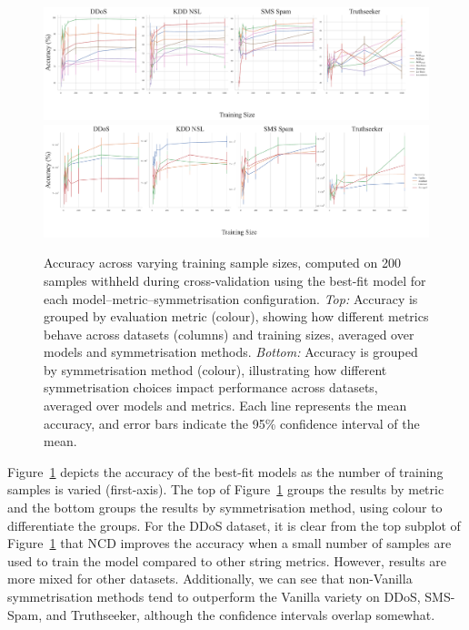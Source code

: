 \documentclass[preprint,12pt]{article}
\begin{document}
\begin{figure}[!bht]
    \centering
    \includegraphics[width=\textwidth]{images/accuracy_vs_sample_size_vs_metric.pdf}
    \hfill
    \includegraphics[width=\textwidth]{images/accuracy_vs_sample_size_vs_symmetric.pdf}
    \caption{
        Accuracy across varying training sample sizes, computed on 200 samples withheld during cross-validation using the best-fit model for each model–metric–symmetrisation configuration. \textit{Top:} Accuracy is grouped by evaluation metric (colour), showing how different metrics behave across datasets (columns) and training sizes, averaged over models and symmetrisation methods. \textit{Bottom:} Accuracy is grouped by symmetrisation method (colour), illustrating how different symmetrisation choices impact performance across datasets, averaged over models and metrics. Each line represents the mean accuracy, and error bars indicate the 95\% confidence interval of the mean.
    }
    \label{fig:sample_size}
\end{figure}

Figure~\ref{fig:sample_size} depicts the accuracy of the best-fit models as the number of training samples is varied (first-axis).
The top of Figure~\ref{fig:sample_size} groups the results by metric and the bottom groups the results by symmetrisation method, using colour to differentiate the groups.
For the DDoS dataset, it is clear from the top subplot of Figure~\ref{fig:sample_size} that NCD improves the accuracy when a small number of samples are used to train the model compared to other string metrics.
However, results are more mixed for other datasets.
Additionally, we can see that non-Vanilla symmetrisation methods tend to outperform the Vanilla variety on DDoS, SMS-Spam, and Truthseeker, although the confidence intervals overlap somewhat.
\end{document}
